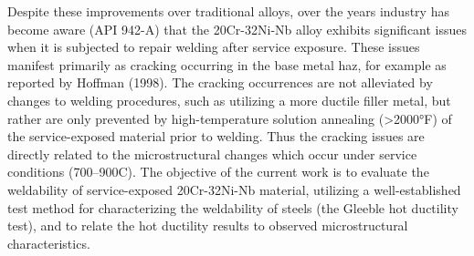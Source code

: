 Despite these improvements over traditional alloys, over the years industry has become aware (API 942-A) that the 20Cr-32Ni-Nb alloy exhibits significant issues when it is subjected to repair welding after service exposure. These issues manifest primarily as cracking occurring in the base metal \gls{haz}, for example as reported by Hoffman (1998). The cracking occurrences are not alleviated by changes to welding procedures, such as utilizing a more ductile filler metal, but rather are only prevented by high-temperature solution annealing (>2000°F) of the service-exposed material prior to welding. Thus the cracking issues are directly related to the microstructural changes which occur under service conditions (700--900C). The objective of the current work is to evaluate the weldability of service-exposed 20Cr-32Ni-Nb material, utilizing a well-established test method for characterizing the weldability of steels (the Gleeble hot ductility test), and to relate the hot ductility results to observed microstructural characteristics.












